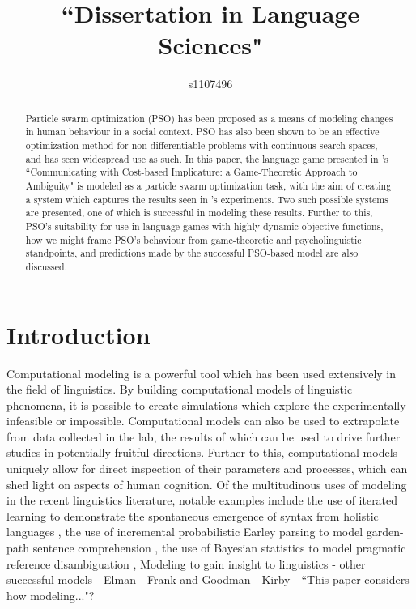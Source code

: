 \documentclass[12pt]{article}
\begin{document}
\title{``Dissertation in Language Sciences"}
\author{s1107496}

\maketitle

\begin{abstract}
Particle swarm optimization (PSO) has been proposed as a means of modeling changes in human behaviour in a social context. PSO has also been shown to be an effective optimization method for non-differentiable problems with continuous search spaces, and has seen widespread use as such. In this paper, the language game presented in \citeauthor{rohde2012}'s ``Communicating with Cost-based Implicature: a Game-Theoretic Approach to Ambiguity" is modeled as a particle swarm optimization task, with the aim of creating a system which captures the results seen in \citeauthor{rohde2012}'s experiments. Two such possible systems are presented, one of which is successful in modeling these results. Further to this, PSO's suitability for use in language games with highly dynamic objective functions, how we might frame PSO's behaviour from game-theoretic and psycholinguistic standpoints, and predictions made by the successful PSO-based model are also discussed.
\end{abstract}



\section{Introduction}
Computational modeling is a powerful tool which has been used extensively in the field of linguistics. By building computational models of linguistic phenomena, it is possible to create simulations which explore the experimentally infeasible or impossible. Computational models can also be used to extrapolate from data collected in the lab, the results of which can be used to drive further studies in potentially fruitful directions. Further to this, computational models uniquely allow for direct inspection of their parameters and processes, which can shed light on aspects of human cognition. Of the multitudinous uses of modeling in the recent linguistics literature, notable examples include the use of iterated learning to demonstrate the spontaneous emergence of syntax from holistic languages \citep{kirby2002}, the use of incremental probabilistic Earley parsing to model garden-path sentence comprehension \citep{hale2001}, the use of Bayesian statistics to model pragmatic reference disambiguation \citep{frankgoodman2012},
Modeling to gain insight to linguistics - other successful models - Elman - Frank and Goodman - Kirby - ``This paper considers how modeling..."?
\end{document}
